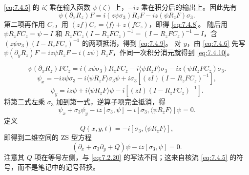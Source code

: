 \documentclass[lang=cn,scheme=chinese,mode=simple,device=normal,color=blue,math=cm,thmcnt=section,12pt]{elegantbook}
\newcommand{\eqq}[2]{\tag{#1}\label{eq:#1}#2}
\begin{document}
\begin{callout}
\eqref{eq:7.4.5} 的 $i\zeta$ 乘在输入函数 $\psi(\zeta)$ 上，$-iz$ 乘在积分后的输出上。因此先有
\[
\psi(\partial_xR_z)F=i(z\psi\sigma_3)R_zF-iz(\psi R_zF)\sigma_3.
\]
第二项再作用 $C_z$，用 $(zf)C_z=\langle f\rangle+z(fC_z)$，即得 \eqref{eq:7.4.8}。
随后用 $\psi R_zFC_z=\psi-I$ 和
$R_zFC_z(I-R_zFC_z)^{-1}=(I-R_zFC_z)^{-1}-I$，含 $(z\psi\sigma_3)(I-R_zFC_z)^{-1}$ 的两项抵消，得到 \eqref{eq:7.4.9}。
对 $y$，由 \eqref{eq:7.4.6} 先写
$\psi(\partial_yR_z)F=iz\psi R_zF-i(z\psi)R_zF$，作同一次积分消元就得到 \eqref{eq:7.4.10}。
\end{callout}
\begin{equation}
\eqq{7.4.8}{\psi(\partial_xR_z)FC_z=i(z\psi\sigma_3)R_zFC_z-i\langle\psi R_zF\rangle\sigma_3-iz(\psi R_zFC_z)\sigma_3.}
\end{equation}
\begin{equation}
\eqq{7.4.9}{\psi_x=-iz\psi\sigma_3-i\langle\psi R_zF\rangle\sigma_3\psi
+i\sigma_3[(zI)(I-R_zFC_z)^{-1}],}
\end{equation}
\begin{equation}
\eqq{7.4.10}{\psi_y=iz\psi+i\langle\psi R_zF\rangle\psi-i[(zI)(I-R_zFC_z)^{-1}].}
\end{equation}
将第二式左乘 $\sigma_3$ 加到第一式，逆算子项完全抵消，得
\begin{equation}
\eqq{7.4.11}{\psi_x+\sigma_3\psi_y-iz[\sigma_3,\psi]-i[\sigma_3,\langle\psi R_zF\rangle]\psi=0.}
\end{equation}
定义
\begin{equation}
\eqq{7.4.12}{Q(x,y,t)=-i[\sigma_3,\langle\psi R_zF\rangle],}
\end{equation}
即得到二维空间的 ZS 型方程
\begin{equation}
\eqq{7.4.13}{(\partial_x+\sigma_3\partial_y+Q)\psi-iz[\sigma_3,\psi]=0.}
\end{equation}
注意其 $Q$ 项在等号左侧，与 \eqref{eq:7.2.20} 的写法不同；这来自核流 \eqref{eq:7.4.5} 的符号，而不是笔记中的记号替换。
\end{document}
